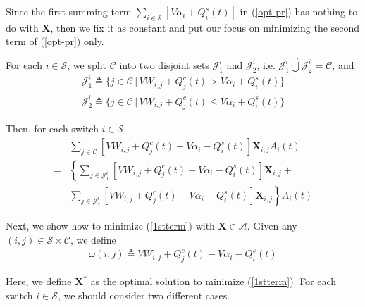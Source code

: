 \documentclass[10pt,journal,compsoc]{IEEEtran}
\begin{document}
Since the first summing term $\sum_{i \in \mathcal{S}} [V\alpha_i + Q_i^s(t)]$ in (\ref{opt-pr}) has nothing to do with $\mathbf{X}$, then we fix it as constant and put our focus on minimizing the second term of (\ref{opt-pr}) only. 

For each $i \in \mathcal{S}$, we split $\mathcal{C}$ into two disjoint sets $\mathcal{J}^i_1$ and $\mathcal{J}^i_2$, i.e. $\mathcal{J}^i_1 \mathbin{\dot{\bigcup}} \mathcal{J}^i_2 = \mathcal{C}$, and
\begin{equation}\label{ji1}
	\begin{array}{c}
		\mathcal{J}^i_1 \triangleq \{ j \in \mathcal{C} \,|\, V W_{i,j} +  Q_j^c(t) > V\alpha_i + Q^s_i(t) \}
	\end{array}
\end{equation} 
\begin{equation}\label{ji2}
	\begin{array}{c}
		\mathcal{J}^i_2 \triangleq \{ j \in \mathcal{C} \,|\, V W_{i,j} +  Q_j^c(t) \le V\alpha_i + Q^s_i(t) \}		
	\end{array}
\end{equation} 

Then, for each switch $i \in \mathcal{S}$,
\begin{equation}\label{1stterm}
	\begin{array}{cl}
		& \displaystyle 
			\sum_{j \in \mathcal{C}} 
			\left[ V W_{i,j} +  Q_j^c(t) - V\alpha_i - Q^s_i(t) \right] \mathbf{X}_{i,j} A_i(t) \\
		= & \displaystyle 
			\left\{ 
			\sum_{j \in \mathcal{J}^{i}_1} \left[ V W_{i,j} +  Q_j^c(t) - V\alpha_i - Q^s_i(t) \right] \mathbf{X}_{i,j} + \right. \\
		& \displaystyle \left. \sum_{j\in\mathcal{J}^{i}_2} \left[ V W_{i,j} +  Q_j^c(t) - V\alpha_i - Q^s_i(t) \right] \mathbf{X}_{i,j}	
		\right\} A_i(t)
	\end{array}
\end{equation}

Next, we show how to minimize (\ref{1stterm}) with $\mathbf{X} \in \mathcal{A}$. Given any $(i,j) \in \mathcal{S} \times \mathcal{C}$, we define
\begin{equation}\label{weight-fn}
	\begin{array}{c}
		\omega(i,j) \triangleq V W_{i,j} +  Q_j^c(t) - V\alpha_i - Q^s_i(t)
	\end{array}
\end{equation}

Here, we define $\mathbf{X}^{*}$ as the optimal solution to minimize (\ref{1stterm}). For each switch $i \in \mathcal{S}$, we should consider two different cases.
\end{document}
